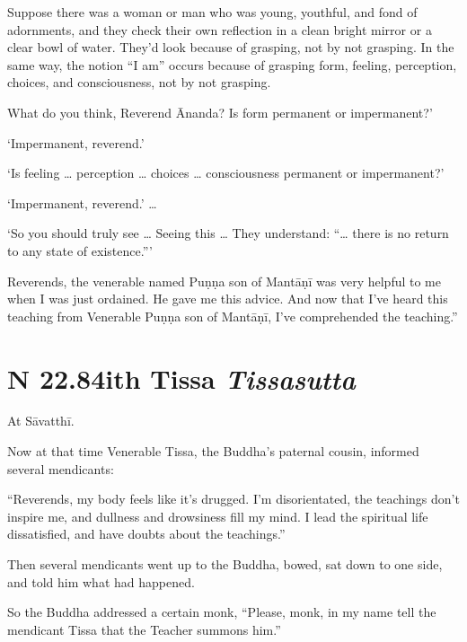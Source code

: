 \documentclass[12pt,openany]{book}%
\newcommand*{\suttatitleacronym}[1]{\smaller[2]{#1}\vspace*{.3em}}
\newcommand*{\suttatitletranslation}[1]{\linebreak{#1}}
\newcommand*{\suttatitleroot}[1]{\linebreak\smaller[2]\itshape{#1}}
\newcommand*{\tocacronym}[1]{\hspace*{-3.3em}{#1}\quad}
\newcommand*{\toctranslation}[1]{#1}
\newcommand*{\tocroot}[1]{(\textit{#1})}
\begin{document}
Suppose there was a woman or man who was young, youthful, and fond of adornments, and they check their own reflection in a clean bright mirror or a clear bowl of water. They’d look because of grasping, not by not grasping. In the same way, the notion “I am” occurs because of grasping form, feeling, perception, choices, and consciousness, not by not grasping. 

What do you think, Reverend Ānanda? Is form permanent or impermanent?’ 

‘Impermanent, reverend.’ 

‘Is feeling … perception … choices … consciousness permanent or impermanent?’ 

‘Impermanent, reverend.’ … 

‘So you should truly see … Seeing this … They understand: “… there is no return to any state of existence.”’ 

Reverends, the venerable named \textsanskrit{Puṇṇa} son of \textsanskrit{Mantāṇī} was very helpful to me when I was just ordained. He gave me this advice. And now that I’ve heard this teaching from Venerable \textsanskrit{Puṇṇa} son of \textsanskrit{Mantāṇī}, I’ve comprehended the teaching.” 

%
\section*{{\suttatitleacronym SN 22.84}{\suttatitletranslation With Tissa }{\suttatitleroot Tissasutta}}
\addcontentsline{toc}{section}{\tocacronym{SN 22.84} \toctranslation{With Tissa } \tocroot{Tissasutta}}

At \textsanskrit{Sāvatthī}. 

Now at that time Venerable Tissa, the Buddha’s paternal cousin, informed several mendicants: 

“Reverends, my body feels like it’s drugged. I’m disorientated, the teachings don’t inspire me, and dullness and drowsiness fill my mind. I lead the spiritual life dissatisfied, and have doubts about the teachings.” 

Then several mendicants went up to the Buddha, bowed, sat down to one side, and told him what had happened. 

So the Buddha addressed a certain monk, “Please, monk, in my name tell the mendicant Tissa that the Teacher summons him.” 
\end{document}

